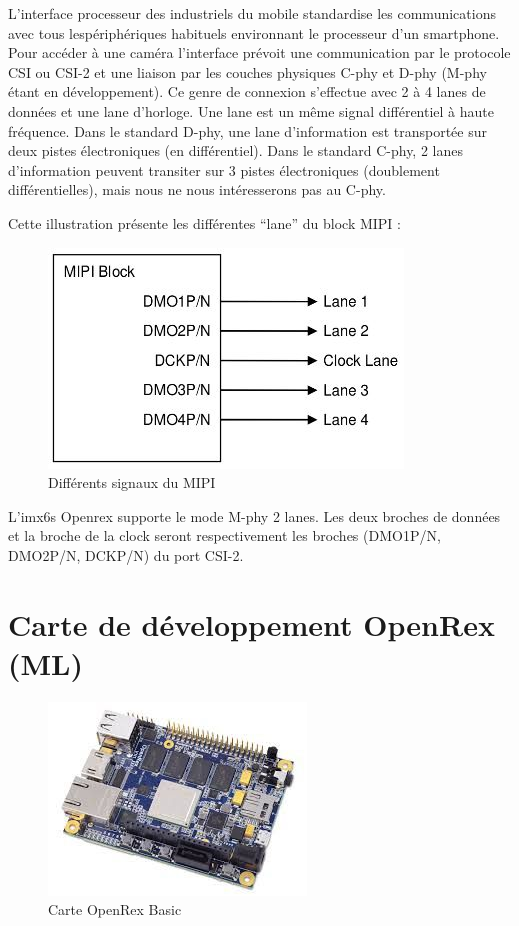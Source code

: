L’interface processeur des industriels du mobile
standardise les communications avec tous lespériphériques habituels environnant le processeur d’un smartphone. Pour accéder à une
caméra l’interface prévoit une communication par le protocole CSI ou CSI-2 et une liaison
par les couches physiques C-phy et D-phy (M-phy étant en développement). Ce genre de
connexion s’effectue avec 2 à 4 lanes de données et une lane d’horloge. Une lane est un
même signal différentiel à haute fréquence. Dans le standard D-phy, une lane
d’information est transportée sur deux pistes électroniques (en différentiel). Dans le
standard C-phy, 2 lanes d’information peuvent transiter sur 3 pistes électroniques
(doublement différentielles), mais nous ne nous intéresserons pas au C-phy. \medskip

Cette illustration présente les différentes “lane” du block MIPI :

\begin{figure}[!htb]
    \centering
    \includegraphics[trim={0cm 0cm 0cm 0cm},clip,scale=0.4]{Figures/blockMIPI.png}
    \decoRule
    \caption{Différents signaux du MIPI} \label{fig:blockmipi}
\end{figure}

L’imx6s Openrex supporte le mode M-phy 2 lanes. Les deux broches de données et la
broche de la clock seront respectivement les broches (DMO1P/N, DMO2P/N, DCKP/N) du
port CSI-2.

\section{Carte de développement OpenRex (ML)}

\begin{figure}[!htb]
    \centering
    \includegraphics[trim={0cm 0cm 0cm 0cm},clip,scale=0.55]{Figures/openrex.png}
    \decoRule
    \caption{Carte OpenRex Basic} \label{fig:openrex}
\end{figure}

